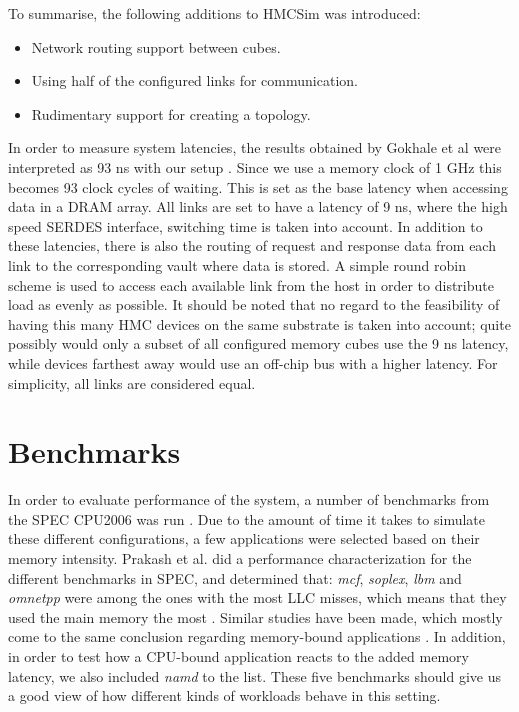 To summarise, the following additions to HMCSim was introduced:
\begin{itemize}
  \item Network routing support between cubes.
  \item Using half of the configured links for communication.
  \item Rudimentary support for creating a topology.
\end{itemize}
\bigskip

In order to measure system latencies, the results obtained by Gokhale et al were interpreted as 93 ns with our setup \cite{10.1145/2833179.2833184}. Since we use a memory clock of 1 GHz this becomes 93 clock cycles of waiting. This is set as the base latency when accessing data in a DRAM array. All links are set to have a latency of 9 ns, where the high speed SERDES interface, switching time is taken into account. In addition to these latencies, there is also the routing of request and response data from each link to the corresponding vault where data is stored. A simple round robin scheme is used to access each available link from the host in order to distribute load as evenly as possible. It should be noted that no regard to the feasibility of having this many HMC devices on the same substrate is taken into account; quite possibly would only a subset of all configured memory cubes use the 9 ns latency, while devices farthest away would use an off-chip bus with a higher latency. For simplicity, all links are considered equal.


\section{Benchmarks} \label{method-benches}
In order to evaluate performance of the system, a number of benchmarks from the SPEC CPU2006 was run \cite{henning2006spec}. Due to the amount of time it takes to simulate these different configurations, a few applications were selected based on their memory intensity. Prakash et al. did a performance characterization for the different benchmarks in SPEC, and determined that: \emph{mcf}, \emph{soplex}, \emph{lbm} and \emph{omnetpp} were among the ones with the most LLC misses, which means that they used the main memory the most \cite{prakash2008performance}. Similar studies have been made, which mostly come to the same conclusion regarding memory-bound applications \cite{4664856, 4086140, bird2007performance}. In addition, in order to test how a CPU-bound application reacts to the added memory latency, we also included \emph{namd} to the list. These five benchmarks should give us a good view of how different kinds of workloads behave in this setting. 
\bigskip

